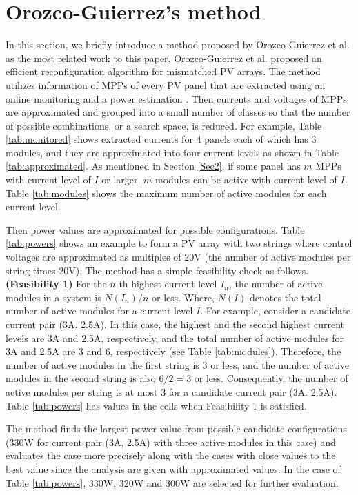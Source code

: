\documentclass[conference]{pvsctran}
\begin{document}
\section{Orozco-Guierrez's method}\label{Sec3}
In this section, we briefly introduce a method proposed by Orozco-Guierrez et al.\cite{orozco2016optimized} as the most related work to this paper.
Orozco-Guierrez et al. proposed an efficient reconfiguration algorithm for mismatched PV arrays. 
The method utilizes information of MPPs of every PV panel that are extracted using an online monitoring \cite{carotenuto2014online} and a power estimation \cite{orozco2015fast}. 
Then currents and voltages of MPPs are approximated and grouped into a small number of classes so that the number of possible combinations, or a search space, is reduced.
For example, Table \ref{tab:monitored} shows extracted currents for 4 panels each of which has 3 modules, and they are approximated into four current levels as shown in Table \ref{tab:approximated}. 
As mentioned in Section \ref{Sec2}, if some panel has $m$ MPPs with current level of $I$ or larger, $m$ modules can be active with current level of $I$. 
Table \ref{tab:modules} shows the maximum number of active modules for each current level. 

Then power values are approximated for possible configurations. 
Table \ref{tab:powers} shows an example to form a PV array with two strings where control voltages are approximated as multiples of 20V (the number of active modules per string times 20V). 
The method has a simple feasibility check as follows. 
\newline{}
\textbf{(Feasibility 1)} For the $n$-th highest current level $I_{n}$, the number of active modules in a system is $N(I_{n}) / n$ or less. 
\newline{}
Where, $N(I)$ denotes the total number of active modules for a current level $I$. 
For example, consider a candidate current pair (3A. 2.5A). In this case, the highest and the second highest current levels are 3A and 2.5A, respectively, and the total number of active modules for 3A and 2.5A are 3 and 6, respectively (see Table \ref{tab:modules}). Therefore, the number of active modules in the first string is 3 or less, and the number of active modules in the second string is also $ 6/2  = 3$ or less. Consequently, the number of active modules per string is at most 3 for a candidate current pair (3A. 2.5A). Table \ref{tab:powers} has values in the cells when Feasibility 1 is satisfied. 

The method finds the largest power value from possible candidate configurations (330W for current pair (3A, 2.5A) with three active modules in this case) and evaluates the case more precisely along with the cases with close values to the best value since the analysis are given with approximated values. In the case of Table \ref{tab:powers}, 330W, 320W and 300W are selected for further evaluation. 
\end{document}
